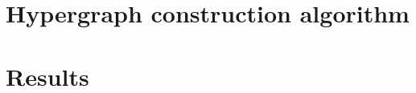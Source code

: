 \documentclass[../Master.tex]{subfiles}
\begin{document}
\providecommand{\master}{..}

\section{Hypergraph construction algorithm}\label{sec:Impl:HGConstruction}
    

\section{Results}\label{sec:Impl:Results}
    
\end{document}

